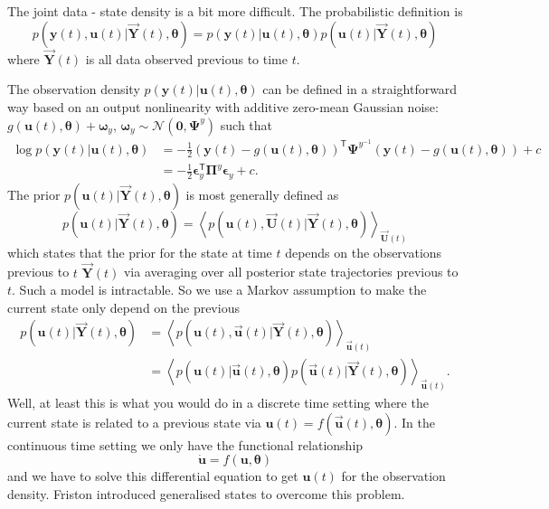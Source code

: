 \documentclass[a4paper,10pt]{article}
\newcommand{\bs}[1]{\mathbf{#1}}					%
\newcommand{\bgs}[1]{\boldsymbol{#1}}				%
\newcommand{\tr}{\mathsf{T}}				%
\newcommand{\eq}[1]{\begin{equation} #1 \end{equation}}%
\renewcommand{\ss}{u}         %
\newcommand{\so}{y}         %
\newcommand{\spe}{\epsilon} %
\renewcommand{\sp}{\theta}    %
\newcommand{\ps}{\bs{\ss}}    %
\newcommand{\po}{\bs{\so}}    %
\newcommand{\ppe}{\bgs{\spe}} %
\newcommand{\pp}{\bgs{\sp}} %
\newcommand{\Ps}{\bs{U}}    %
\newcommand{\Po}{\bs{Y}}    %
\newcommand{\E}[2][]{\left\langle #2 \right\rangle_{#1}}	%
\newcommand{\N}{\mathcal{N}}			%
\begin{document}
The joint data - state density is a bit more difficult. The probabilistic definition is
\eq{
    p(\po(t),\ps(t)|\vec{\Po}(t),\pp) = p(\po(t)|\ps(t),\pp)p(\ps(t)|\vec{\Po}(t),\pp)
}
where $\vec{\Po}(t)$ is all data observed previous to time $t$.

The observation density $p(\po(t)|\ps(t),\pp)$ can be defined in a straightforward way based on an output nonlinearity with additive zero-mean Gaussian noise: $g(\ps(t),\pp)+\bgs{\omega}_\so$, $\bgs{\omega}_\so\sim \N(\bs{0},\bgs{\Psi}^\so)$ such that
\begin{align}
    \log p(\po(t)|\ps(t),\pp) &= -\frac{1}{2}(\po(t) - g(\ps(t),\pp))^\tr\bgs{\Psi}^{\so^{-1}}(\po(t) - g(\ps(t),\pp)) + c\\
    &= -\frac{1}{2}\ppe_\so^\tr\bgs{\Pi}^{\so}\ppe_\so + c.
\end{align}
The prior $p(\ps(t)|\vec{\Po}(t),\pp)$ is most generally defined as
\eq{
    p(\ps(t)|\vec{\Po}(t),\pp) = \E[\vec{\Ps}(t)]{p(\ps(t),\vec{\Ps}(t)|\vec{\Po}(t),\pp)}
}
which states that the prior for the state at time $t$ depends on the observations previous to $t$ $\vec{\Po}(t)$ via averaging over all posterior state trajectories previous to $t$. Such a model is intractable. So we use a Markov assumption to make the current state only depend on the previous
\begin{align}
    p(\ps(t)|\vec{\Po}(t),\pp) &= \E[\vec{\ps}(t)]{p(\ps(t),\vec{\ps}(t)|\vec{\Po}(t),\pp)}\\
    &= \label{eq:statePrior} \E[\vec{\ps}(t)]{p(\ps(t)|\vec{\ps}(t),\pp)p(\vec{\ps}(t)|\vec{\Po}(t),\pp)}.
\end{align}
Well, at least this is what you would do in a discrete time setting where the current state is related to a previous state via $\ps(t) = f(\vec{\ps}(t),\pp)$. In the continuous time setting we only have the functional relationship
\eq{
    \dot{\ps} = f(\ps,\pp)
}
and we have to solve this differential equation to get $\ps(t)$ for the observation density. Friston introduced generalised states to overcome this problem. 
\end{document}
